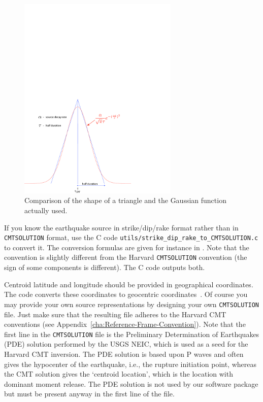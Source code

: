 \documentclass[oneside,english]{book}
\begin{document}
%
\begin{figure}
\noindent \begin{centering}
\includegraphics[width=3in]{figures/gauss_vs_triangle_mod}
\par\end{centering}
\caption{Comparison of the shape of a triangle and the Gaussian function actually used.}
\label{fig:gauss.vs.triangle}
\end{figure}

If you know the earthquake source in strike/dip/rake format rather than in \texttt{CMTSOLUTION} format,
use the C code \texttt{utils/strike\_dip\_rake\_to\_CMTSOLUTION.c} to convert it.
The conversion formulas are given for instance in \cite{AkRi80}.
Note that the \cite{AkRi80} convention is slightly different from the Harvard \texttt{CMTSOLUTION} convention
(the sign of some components is different). The C code outputs both.

Centroid latitude and longitude should be provided in geographical
coordinates. The code converts these coordinates to geocentric coordinates~\citep{DaTr98}.
Of course you may provide your own source representations by designing
your own \texttt{CMTSOLUTION} file. Just make sure that the resulting
file adheres to the Harvard CMT conventions (see Appendix~\ref{cha:Reference-Frame-Convention}).
Note that the first line in the \texttt{CMTSOLUTION} file is the Preliminary Determination of Earthquakes (PDE) solution performed by the USGS NEIC, which is used as a seed for the Harvard CMT inversion. The PDE solution is based upon P waves and often gives the hypocenter of the earthquake, i.e., the rupture initiation point, whereas the CMT solution gives the `centroid location', which is the location with dominant moment release. The PDE solution is not used by our software package but must be present anyway in the first line of the file.
\end{document}
